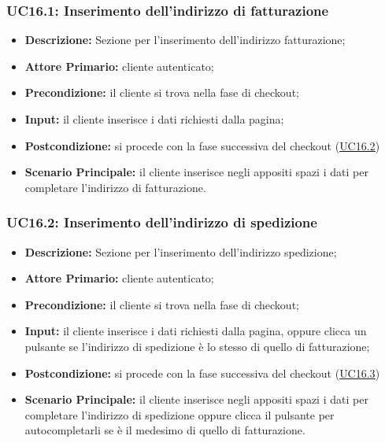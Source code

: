             \subsubsection{UC16.1: Inserimento dell'indirizzo di fatturazione}
            \label{sec:UC16.1}
                \begin{itemize}
                    \item \textbf{Descrizione:} Sezione per l'inserimento dell'indirizzo fatturazione;
                    \item \textbf{Attore Primario:} cliente autenticato;
                    \item \textbf{Precondizione:} il cliente si trova nella fase di checkout;
                    \item \textbf{Input:} il cliente inserisce i dati richiesti dalla pagina;
                    \item \textbf{Postcondizione:} si procede con la fase successiva del checkout (\hyperref[sec:UC16.2]{\underline{UC16.2}})
                    \item \textbf{Scenario Principale:} il cliente inserisce negli appositi spazi i dati per completare l'indirizzo di fatturazione.
                \end{itemize}
            \subsubsection{UC16.2: Inserimento dell'indirizzo di spedizione}
            \label{sec:UC16.2}
                \begin{itemize}
                    \item \textbf{Descrizione:} Sezione per l'inserimento dell'indirizzo spedizione;
                    \item \textbf{Attore Primario:} cliente autenticato;
                    \item \textbf{Precondizione:} il cliente si trova nella fase di checkout;
                    \item \textbf{Input:} il cliente inserisce i dati richiesti dalla pagina, oppure clicca un pulsante se l'indirizzo di spedizione è lo stesso di quello di fatturazione;
                    \item \textbf{Postcondizione:} si procede con la fase successiva del checkout (\hyperref[sec:UC16.3]{\underline{UC16.3}})
                    \item \textbf{Scenario Principale:} il cliente inserisce negli appositi spazi i dati per completare l'indirizzo di spedizione oppure clicca il pulsante per autocompletarli se è il medesimo di quello di fatturazione.
                \end{itemize}
